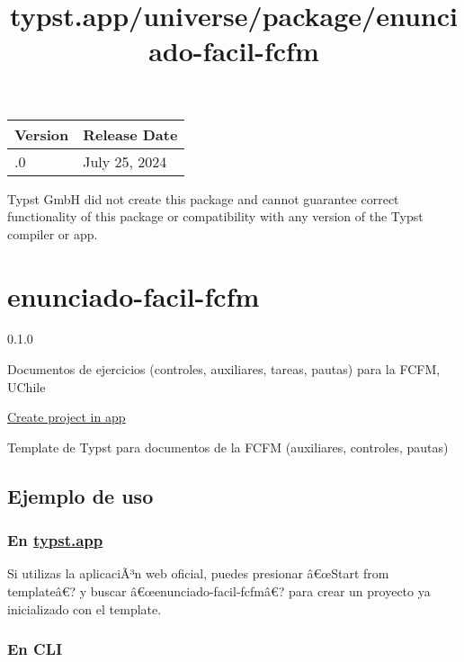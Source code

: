 \begin{longtable}[]{@{}ll@{}}
\toprule\noalign{}
Version & Release Date \\
\midrule\noalign{}
\endhead
\bottomrule\noalign{}
\endlastfoot
0.1.0 & July 25, 2024 \\
\end{longtable}

Typst GmbH did not create this package and cannot guarantee correct
functionality of this package or compatibility with any version of the
Typst compiler or app.


\title{typst.app/universe/package/enunciado-facil-fcfm}

\label{banner}
\label{template-thumbnail}

\section{enunciado-facil-fcfm}\label{enunciado-facil-fcfm}

{ 0.1.0 }

Documentos de ejercicios (controles, auxiliares, tareas, pautas) para la
FCFM, UChile

\href{/app?template=enunciado-facil-fcfm&version=0.1.0}{Create project
in app}

\label{readme}
Template de Typst para documentos de la FCFM (auxiliares, controles,
pautas)

\subsection{Ejemplo de uso}\label{ejemplo-de-uso}

\subsubsection{\texorpdfstring{En
\href{https://typst.app/}{typst.app}}{En typst.app}}\label{en-typst.app}

Si utilizas la aplicaciÃ³n web oficial, puedes presionar â€œStart from
templateâ€? y buscar â€œenunciado-facil-fcfmâ€? para crear un proyecto
ya inicializado con el template.

\subsubsection{En CLI}\label{en-cli}

